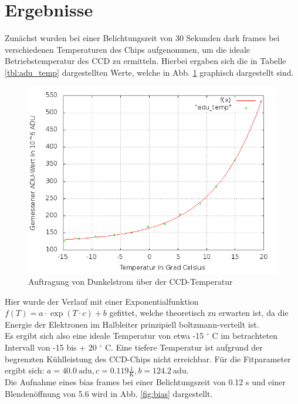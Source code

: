 \section{Ergebnisse}
Zunächst wurden bei einer Belichtungszeit von 30 Sekunden dark frames bei verschiedenen Temperaturen des Chips aufgenommen, um die ideale Betriebstemperatur des CCD zu ermitteln. Hierbei ergaben sich die in Tabelle \ref{tbl:adu_temp} dargestellten Werte, welche in Abb. \ref{fig:adu_temp} graphisch dargestellt sind. 
\begin{figure}[h!]
        \includegraphics[width=.9\textwidth]{plot_adu_temp2.png}
\caption{ Auftragung von Dunkelstrom über der CCD-Temperatur }
\label{fig:adu_temp}
\end{figure}
Hier wurde der Verlauf mit einer Exponentialfunktion $f(T) = a \cdot \exp(T \cdot c) + b$ gefittet, welche theoretisch zu erwarten ist, da die Energie der Elektronen im Halbleiter prinzipiell boltzmann-verteilt ist. \\
Es ergibt sich also eine ideale Temperatur von etwa -15 $^\circ$ C im betrachteten Intervall von -15 bis + 20 $^\circ$ C. Eine tiefere Temperatur ist aufgrund der begrenzten Kühlleistung des CCD-Chips nicht erreichbar. Für die Fitparameter ergibt sich: 
$a = 40.0\  \mathrm{adu}, c = 0.119 \frac{1}{\mathrm{K}}, b = 124.2 \ \mathrm{adu}$. \\
Die Aufnahme eines bias frames bei einer Belichtungszeit von 0.12 s und einer Blendenöffnung von 5.6 wird in Abb. \ref{fig:bias} dargestellt. 
